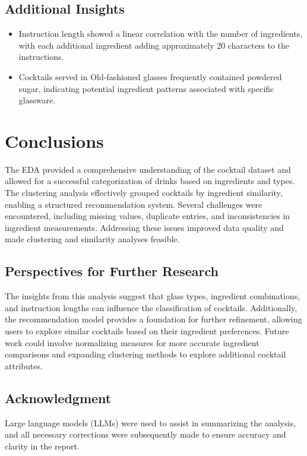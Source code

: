 \documentclass[a4paper]{article}
\begin{document}
\subsection{Additional Insights}
\begin{itemize}
    \item Instruction length showed a linear correlation with the number of ingredients, with each additional ingredient adding approximately 20 characters to the instructions.
    \item Cocktails served in Old-fashioned glasses frequently contained powdered sugar, indicating potential ingredient patterns associated with specific glassware.
\end{itemize}

\section{Conclusions}
The EDA provided a comprehensive understanding of the cocktail dataset and allowed for a successful categorization of drinks based on ingredients and types. The clustering analysis effectively grouped cocktails by ingredient similarity, enabling a structured recommendation system. Several challenges were encountered, including missing values, duplicate entries, and inconsistencies in ingredient measurements. Addressing these issues improved data quality and made clustering and similarity analyses feasible.

\subsection{Perspectives for Further Research}
The insights from this analysis suggest that glass types, ingredient combinations, and instruction lengths can influence the classification of cocktails. Additionally, the recommendation model provides a foundation for further refinement, allowing users to explore similar cocktails based on their ingredient preferences. Future work could involve normalizing measures for more accurate ingredient comparisons and expanding clustering methods to explore additional cocktail attributes.

\subsection{Acknowledgment}
Large language models (LLMs) were used to assist in summarizing the analysis, and all necessary corrections were subsequently made to ensure accuracy and clarity in the report.
\end{document}
